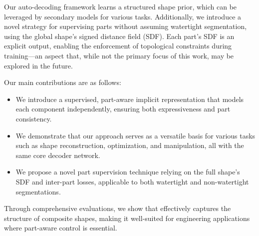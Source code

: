 Our auto-decoding framework learns a structured shape prior, which can be leveraged by secondary models for various tasks. Additionally, we introduce a novel strategy for supervising parts without assuming watertight segmentation, using the global shape’s signed distance field (SDF). Each part’s SDF is an explicit output, enabling the enforcement of topological constraints during training—an aspect that, while not the primary focus of this work, may be explored in the future.

Our main contributions are as follows:
\vspace{-2mm}
\begin{itemize}[itemsep=0em]
	\item We introduce a supervised, part-aware implicit representation that models each component independently, ensuring both expressiveness and part consistency.
	\item We demonstrate that our approach serves as a versatile basis for various tasks such as shape reconstruction, optimization, and manipulation, all with the same core decoder network.
	\item We propose a novel part supervision technique relying on the full shape's SDF and inter-part losses, applicable to both watertight and non-watertight segmentations.
\end{itemize}
\vspace{-2mm}
Through comprehensive evaluations, we show that \PSDF{} effectively captures the structure of composite shapes, making it well-suited for engineering applications where part-aware control is essential.



\iffalse



